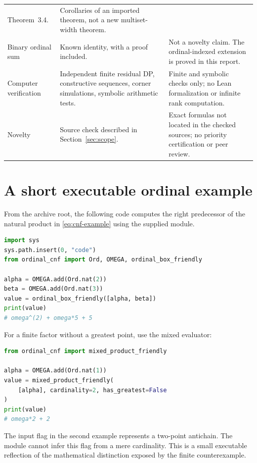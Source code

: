 \documentclass[11pt,letterpaper]{article}
\theoremstyle{definition}
\theoremstyle{remark}
\begin{document}
\begin{longtable}{@{}p{}p{}p{}@{}}
Theorem~3.4. & Corollaries of an imported theorem, not a new multiset-width
theorem.\\
Binary ordinal sum & Known identity, with a proof included. & Not a
novelty claim. The ordinal-indexed extension is proved in this report.\\
Computer verification & Independent finite residual DP, constructive
sequences, corner simulations, symbolic arithmetic tests. & Finite and
symbolic checks only; no Lean formalization or infinite rank computation.\\
Novelty & Source check described in Section~\ref{sec:scope}. & Exact
formulas not located in the checked sources; no priority certification or
peer review.\\
\bottomrule
\end{longtable}
\normalsize

\clearpage
\section{A short executable ordinal example}\label{app:code}

From the archive root, the following code computes the right predecessor
of the natural product in \eqref{eq:cnf-example} using the supplied module.
\begin{lstlisting}[language=Python]
import sys
sys.path.insert(0, "code")
from ordinal_cnf import Ord, OMEGA, ordinal_box_friendly

alpha = OMEGA.add(Ord.nat(2))
beta = OMEGA.add(Ord.nat(3))
value = ordinal_box_friendly([alpha, beta])
print(value)
# omega^(2) + omega*5 + 5
\end{lstlisting}

For a finite factor without a greatest point, use the mixed evaluator:
\begin{lstlisting}[language=Python]
from ordinal_cnf import mixed_product_friendly

alpha = OMEGA.add(Ord.nat(1))
value = mixed_product_friendly(
    [alpha], cardinality=2, has_greatest=False
)
print(value)
# omega*2 + 2
\end{lstlisting}

The input flag in the second example represents a two-point antichain.
The module cannot infer this flag from a mere cardinality. This is a
small executable reflection of the mathematical distinction exposed by
the finite counterexample.
\end{document}
